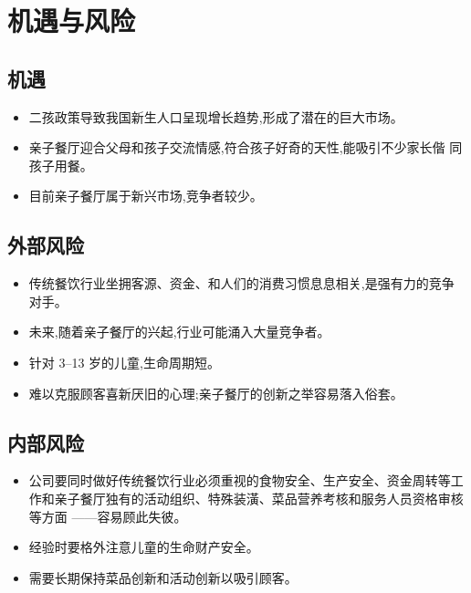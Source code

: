 \chapter{机遇与风险}

\section{机遇}
\begin{itemize}
        \item  二孩政策导致我国新生人口呈现增长趋势,形成了潜在的巨大市场。
        \item  亲子餐厅迎合父母和孩子交流情感,符合孩子好奇的天性,能吸引不少家长偕
                同孩子用餐。
        \item  目前亲子餐厅属于新兴市场,竞争者较少。
\end{itemize}

\section{外部风险}
\begin{itemize}
        \item  传统餐饮行业坐拥客源、资金、和人们的消费习惯息息相关,是强有力的竞争
                对手。
        \item  未来,随着亲子餐厅的兴起,行业可能涌入大量竞争者。
        \item  针对 3--13 岁的儿童,生命周期短。
        \item  难以克服顾客喜新厌旧的心理;亲子餐厅的创新之举容易落入俗套。
\end{itemize}

\section{内部风险}
\begin{itemize}
        \item  公司要同时做好传统餐饮行业必须重视的食物安全、生产安全、资金周转等工
                作和亲子餐厅独有的活动组织、特殊装潢、菜品营养考核和服务人员资格审核等方面
                ——容易顾此失彼。
        \item  经验时要格外注意儿童的生命财产安全。
        \item  需要长期保持菜品创新和活动创新以吸引顾客。
\end{itemize}

